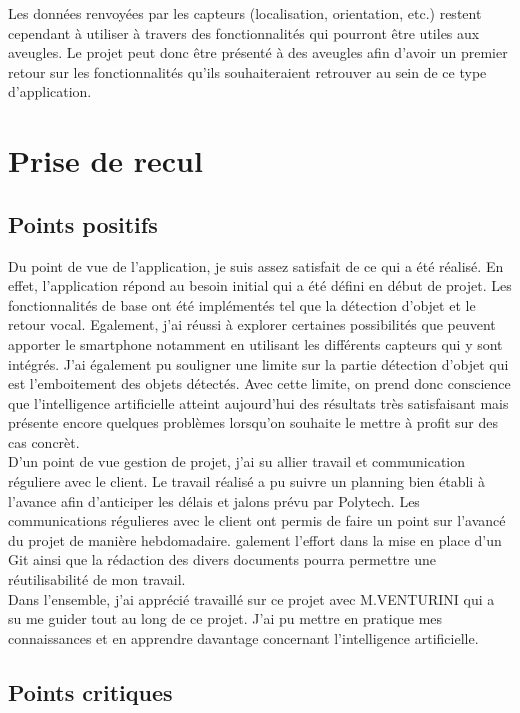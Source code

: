 \documentclass[UTF8]{EPURapport}
\begin{document}
Les données renvoyées par les capteurs (localisation, orientation, etc.) restent cependant à utiliser à travers des fonctionnalités qui pourront être utiles aux aveugles. Le projet peut donc être présenté à des aveugles afin d'avoir un premier retour sur les fonctionnalités qu'ils souhaiteraient retrouver au sein de ce type d'application.

\chapter{Prise de recul}

\section{Points positifs}

Du point de vue de l'application, je suis assez satisfait de ce qui a été réalisé. En effet, l'application répond au besoin initial qui a été défini en début de projet. Les fonctionnalités de base ont été implémentés tel que la détection d'objet et le retour vocal. Egalement, j'ai réussi à explorer certaines possibilités que peuvent apporter le smartphone notamment en utilisant les différents capteurs qui y sont intégrés. J'ai également pu souligner une limite sur la partie détection d'objet qui est l'emboitement des objets détectés. Avec cette limite, on prend donc conscience que l'intelligence artificielle atteint aujourd'hui des résultats très satisfaisant mais présente encore quelques problèmes lorsqu'on souhaite le mettre à profit sur des cas concrèt.\\

D'un point de vue gestion de projet, j'ai su allier travail et communication réguliere avec le client. Le travail réalisé a pu suivre un planning bien établi à l'avance afin d'anticiper les délais et jalons prévu par Polytech. Les communications régulieres avec le client ont permis de faire un point sur l'avancé du projet de manière hebdomadaire. galement l'effort dans la mise en place d'un Git ainsi que la rédaction des divers documents pourra permettre une réutilisabilité de mon travail.\\

Dans l'ensemble, j'ai apprécié travaillé sur ce projet avec M.VENTURINI qui a su me guider tout au long de ce projet. J'ai pu mettre en pratique mes connaissances et en apprendre davantage concernant l'intelligence artificielle.

\section{Points critiques}
\end{document}
